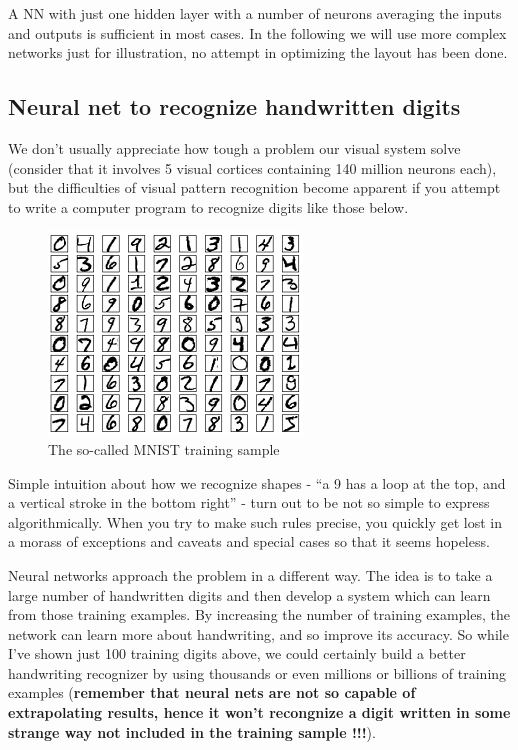 \documentclass[11pt]{article}
\begin{document}
A NN with just one hidden layer with a number of neurons averaging the inputs
and outputs is sufficient in most cases. In the following we will use more
complex networks just for illustration, no attempt in optimizing the layout has been done.

\hypertarget{neural-net-to-recognize-handwritten-digits}{%
\subsection{Neural net to recognize handwritten
digits}\label{neural-net-to-recognize-handwritten-digits}}

We don't usually appreciate how tough a problem our visual system solve
(consider that it involves 5 visual cortices containing 140 million
neurons each), but the difficulties of visual pattern recognition become
apparent if you attempt to write a computer program to recognize digits
like those below.

\begin{figure}
\centering
\includegraphics{mnist_100_digits.png}
\caption{The so-called MNIST training sample}
\end{figure}

Simple intuition about how we recognize shapes - ``a 9 has a loop at the
top, and a vertical stroke in the bottom right'' - turn out to be not so
simple to express algorithmically. When you try to make such rules
precise, you quickly get lost in a morass of exceptions and caveats and
special cases so that it seems hopeless.

Neural networks approach the problem in a different way. The idea is to
take a large number of handwritten digits and then develop a system
which can learn from those training examples. By increasing the number
of training examples, the network can learn more about handwriting, and
so improve its accuracy. So while I've shown just 100 training digits
above, we could certainly build a better handwriting recognizer by using
thousands or even millions or billions of training examples
(\textbf{remember that neural nets are not so capable of extrapolating
results, hence it won't recongnize a digit written in some strange way
not included in the training sample !!!}).
\end{document}
